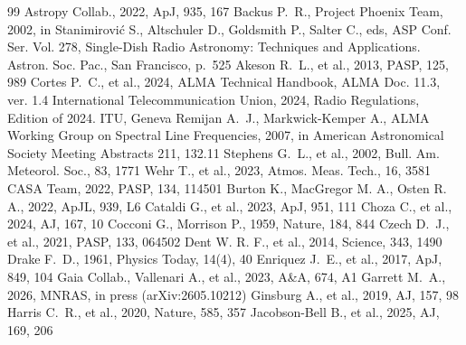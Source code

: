 \documentclass[twocolumn,twocolappendix]{openjournal}
\begin{document}
%
%
%
%
%
\begin{thebibliography}{99}
 Astropy Collab., 2022, ApJ, 935, 167
 Backus P.~R., Project Phoenix Team, 2002, in Stanimirovi\'{c} S., Altschuler D., Goldsmith P., Salter C., eds, ASP Conf. Ser. Vol. 278, Single-Dish Radio Astronomy: Techniques and Applications. Astron. Soc. Pac., San Francisco, p.~525
 Akeson R.~L., et al., 2013, PASP, 125, 989
 Cortes P.~C., et al., 2024, ALMA Technical Handbook, ALMA Doc. 11.3, ver. 1.4
 International Telecommunication Union, 2024, Radio Regulations, Edition of 2024. ITU, Geneva
 Remijan A.~J., Markwick-Kemper A., ALMA Working Group on Spectral Line Frequencies, 2007, in American Astronomical Society Meeting Abstracts 211, 132.11
 Stephens G.~L., et al., 2002, Bull. Am. Meteorol. Soc., 83, 1771
 Wehr T., et al., 2023, Atmos. Meas. Tech., 16, 3581
 CASA Team, 2022, PASP, 134, 114501
 Burton K., MacGregor M. A., Osten R. A., 2022, ApJL, 939, L6
 Cataldi G., et al., 2023, ApJ, 951, 111
 Choza C., et al., 2024, AJ, 167, 10
 Cocconi G., Morrison P., 1959, Nature, 184, 844
 Czech D.~J., et al., 2021, PASP, 133, 064502
 Dent W. R. F., et al., 2014, Science, 343, 1490
 Drake F.~D., 1961, Physics Today, 14(4), 40
 Enriquez J.~E., et al., 2017, ApJ, 849, 104
 Gaia Collab., Vallenari A., et al., 2023, A\&A, 674, A1
 Garrett M.~A., 2026, MNRAS, in press (arXiv:2605.10212)
 Ginsburg A., et al., 2019, AJ, 157, 98
 Harris C.~R., et al., 2020, Nature, 585, 357
 Jacobson-Bell B., et al., 2025, AJ, 169, 206

\end{thebibliography}
\end{document}
